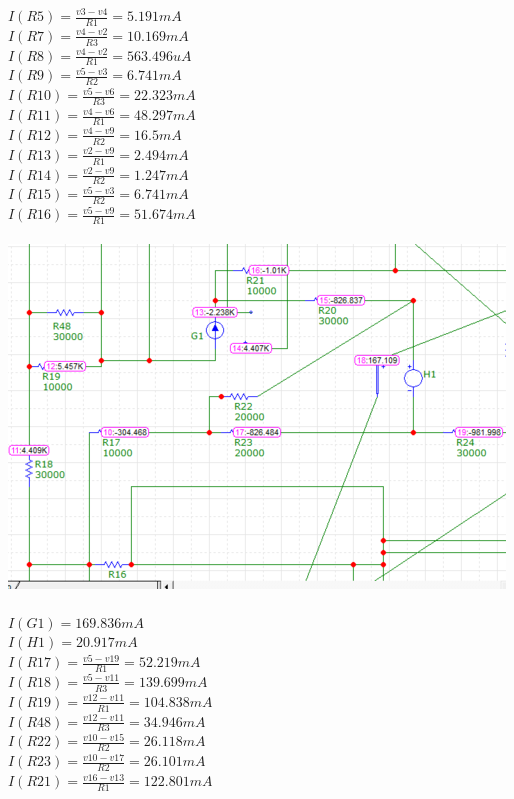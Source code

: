 \documentclass{article}
\begin{document}
$I(R5) = \frac{v3-v4}{R1} = 5.191m A$\\
$I(R7) = \frac{v4-v2}{R3} = 10.169m A$\\
$I(R8) = \frac{v4-v2}{R1} = 563.496u A$\\
$I(R9) = \frac{v5-v3}{R2} = 6.741m A$\\
$I(R10) = \frac{v5-v6}{R3} = 22.323m A$\\
$I(R11) = \frac{v4-v6}{R1} = 48.297m A$\\
$I(R12) = \frac{v4-v9}{R2} = 16.5m A$\\
$I(R13) = \frac{v2-v9}{R1} = 2.494m A$\\
$I(R14) = \frac{v2-v9}{R2} = 1.247m A$\\
$I(R15) = \frac{v5-v3}{R2} = 6.741m A$\\
$I(R16) = \frac{v5-v9}{R1} = 51.674m A$\\ \\
\includegraphics[]{images/MicroCap2_75.PNG}\\ \\
$I(G1) = 169.836m A$\\
$I(H1) = 20.917m A$\\
$I(R17) = \frac{v5-v19}{R1} = 52.219m A$\\ 
$I(R18) = \frac{v5-v11}{R3} = 139.699m A$\\ 
$I(R19) = \frac{v12-v11}{R1} = 104.838m A$\\ 
$I(R48) = \frac{v12-v11}{R3} = 34.946m A$\\ 
$I(R22) = \frac{v10-v15}{R2} = 26.118m A$\\ 
$I(R23) = \frac{v10-v17}{R2} = 26.101m A$\\ 
$I(R21) = \frac{v16-v13}{R1} = 122.801m A$\\ 
\end{document}
